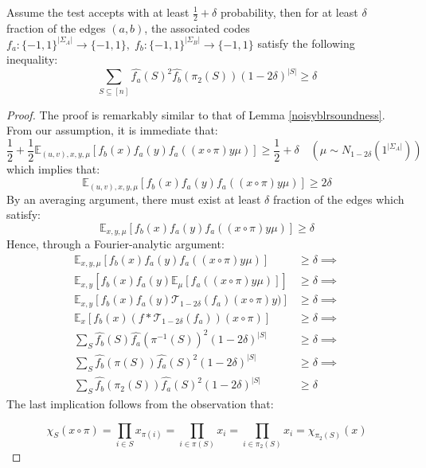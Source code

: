 \begin{lemma} \label{soundnessbound}
  Assume the test accepts with at least $\frac{1}{2} + \delta$ probability, then for at least $\delta$ fraction of the edges $(a,b)$, the associated codes $f_a:\{-1,1\}^{|\Sigma_A|} \rightarrow \{-1,1\}, \; f_b:\{-1,1\}^{|\Sigma_B|} \rightarrow \{-1,1\}$ satisfy the following inequality:
  \begin{equation}
  \sum_{S \subseteq [n]} \widehat{f_a}(S)^2\widehat{f_b}(\pi_2(S))(1-2\delta)^{|S|} \geq \delta
  \end{equation}
\end{lemma}
%
\begin{proof}
  The proof is remarkably similar to that of Lemma \ref{noisyblrsoundness}. From our assumption, it is immediate that:
  \begin{equation}
    \frac{1}{2} + \frac{1}{2}\mathbb{E}_{(u,v),x,y,\mu}\left[f_b(x)f_a(y)f_a((x \circ \pi)y\mu) \right] \geq \frac{1}{2} + \delta  \quad (\mu \sim N_{1 - 2\delta}(1^{|\Sigma_A|}))
  \end{equation}
  which implies that:
  \begin{equation}
    \mathbb{E}_{(u,v),x,y,\mu}\left[f_b(x)f_a(y)f_a((x \circ \pi)y\mu) \right] \geq 2\delta
  \end{equation}
  By an averaging argument, there must exist at least $\delta$ fraction of the edges which satisfy:
  \begin{equation}
      \mathbb{E}_{x,y,\mu}\left[f_b(x)f_a(y)f_a((x \circ \pi)y\mu) \right] \geq \delta
  \end{equation}
  Hence, through a Fourier-analytic argument:
  \begin{align*}
    \mathbb{E}_{x,y,\mu}\left[f_b(x)f_a(y)f_a((x \circ \pi)y\mu) \right] & \geq \delta \implies \\[0.7ex]
    \mathbb{E}_{x,y}\left[f_b(x)f_a(y) \mathbb{E}_{\mu} \left[f_a((x \circ \pi)y\mu) \right] \right] & \geq \delta \implies \\[0.7ex]
    \mathbb{E}_{x,y}\left[f_b(x)f_a(y) \mathcal{T}_{1-2\delta}(f_a)(x \circ \pi)y) \right] & \geq \delta \implies \\[0.7ex]
    \mathbb{E}_{x}\left[ f_b(x)(f * \mathcal{T}_{1 - 2\delta}(f_a))(x \circ \pi) \right] & \geq \delta \implies \\
    \sum_{S} \widehat{f_b}(S) \widehat{f_a}(\pi^{-1}(S))^2(1 - 2\delta)^{|S|} & \geq \delta  \implies \\
    \sum_{S} \widehat{f_b}(\pi(S))\widehat{f_a}(S)^2 (1 - 2\delta)^{|S|} & \geq \delta \implies \\
    \sum_{S} \widehat{f_b}(\pi_2(S))\widehat{f_a}(S)^2 (1 - 2\delta)^{|S|} & \geq \delta
    \end{align*}
    The last implication follows from the observation that:

    \[ \chi_S(x \circ \pi) = \prod_{i \in S} x_{\pi(i)} = \prod_{i \in \pi(S)} x_i = \prod_{i \in \pi_2(S)} x_i = \chi_{\pi_2(S)}(x) \]
\end{proof}

